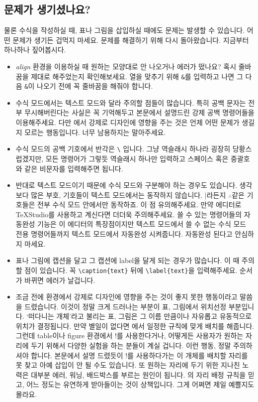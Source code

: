 \subsection{문제가 생기셨나요?}
\label{subsec:problem4}
물론 수식을 작성하실 때, 표나 그림을 삽입하실 때에도 문제는 발생할 수 있습니다.
어떤 문제가 생기든 겁먹지 마세요.
문제를 해결하기 위해 다시 돌아왔습니다.
지금부터 하나하나 짚어봅시다.
\begin{itemize}
	\item \emph{align} 환경을 이용하실 때 원하는 모양대로 안 나오거나 에러가 떴나요?
	혹시 줄바꿈을 제대로 해주었는지 확인해보세요.
	열을 맞추기 위해 \verb|&|를 입력하고 나면 그 다음 \verb|&|이 나오기 전에 꼭 줄바꿈을 해줘야 합니다.

	\item 수식 모드에서는 텍스트 모드와 달라 주의할 점들이 많습니다.
	특히 공백 문자는 전부 무시해버린다는 사실은 꼭 기억해두고 본문에서 설명드린 강제 공백 명령어들을 이용해주세요.
	다만 \lt 에서 강제로 디자인에 영향을 주는 것은 언제 어떤 문제가 생길지 모르는 행동입니다.
	너무 남용하지는 말아주세요.
	
	\item 수식 모드의 공백 기호에서 반각은 \verb|\| 입니다.
	그냥 역슬래시 하나라 굉장히 당황스럽겠지만, 모든 명령어가 그렇듯 역슬래시 하나만 입력하고 스페이스 혹은 중괄호와 같은 비문자를 입력해주면 됩니다.
	
	\item 반대로 텍스트 모드이기 때문에 수식 모드와 구분해야 하는 경우도 있습니다.
	생각보다 많은 부호, 기호들이 텍스트 모드에서는 동작하지 않습니다.
	$\mid$라든지 $\therefore$같은 기호들은 전부 수식 모드 안에서만 동작하죠.
	이 점 유의해주세요.
	만약 에디터로 \TeX Studio를 사용하고 계신다면 더더욱 주의해주세요.
	쓸 수 있는 명령어들의 자동완성 기능은 이 에디터의 특장점이지만 텍스트 모드에서 쓸 수 없는 수식 모드 전용 명령어들까지 텍스트 모드에서 자동완성 시켜줍니다.
	자동완성 된다고 안심하지 마세요.
	
	\item 표나 그림에 캡션을 달고 그 캡션에 label을 달게 되는 경우가 많습니다.
	이 때 주의할 점이 있습니다.
	꼭 \verb|\caption{text}| 뒤에 \verb|\label{text}|을 입력해주세요.
	순서가 바뀌면 에러가 날겁니다.
	
	\item 조금 전에 \lt 환경에서 강제로 디자인에 영향을 주는 것이 좋지 못한 행동이라고 말씀을 드렸습니다.
	이것이 정말 크게 드러나는 부분이 표, 그림에서 위치선정 부분입니다.
	`떠다니는 개체'라고 불리는 표, 그림은 그 이름 만큼이나 자유롭고 유동적으로 위치가 결정됩니다.
	만약 별일이 없다면 \lt 에서 일정한 규칙에 맞게 배치를 해줍니다.
	그런데 table이나 figure 환경에서 !를 사용한다거나, 어떻게든 사용자가 원하는 자리에 두기 위해서 다양한 실험을 하는 분들이 계실 겁니다.
	이런 행동, 정말 주의하셔야 합니다.
	본문에서 설명 드렸듯이 !를 사용하다가는 \lt 이 개체를 배치할 자리를 못 찾고 아예 삽입이 안 될 수도 있습니다.
	또 원하는 자리에 두기 위한 지나친 노력은 대부분 에러, 워닝, 배드박스를 부르는 원인이 됩니다.
	\lt 의 자리 배정 규칙을 믿고, 어느 정도는 유연하게 받아들이는 것이 상책입니다.
	그게 어쩌면 제일 예쁠지도 몰라요.
	

\end{itemize}
